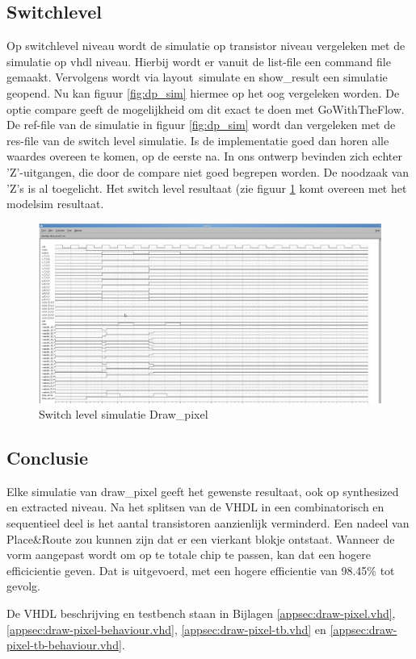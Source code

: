\documentclass{scrartcl} %
\begin{document}
\subsection{Switchlevel}
Op switchlevel niveau wordt de simulatie op transistor niveau vergeleken met de simulatie op vhdl niveau. Hierbij wordt er vanuit de list-file een command file gemaakt. Vervolgens wordt via layout\ simulate en show\_result een simulatie geopend. Nu kan figuur \ref{fig:dp_sim} hiermee op het oog vergeleken worden. De optie compare geeft de mogelijkheid om dit exact te doen met GoWithTheFlow. De ref-file van de simulatie in figuur \ref{fig:dp_sim} wordt dan vergeleken met de res-file van de switch level simulatie. Is de implementatie goed dan horen alle waardes overeen te komen, op de eerste na. In ons ontwerp bevinden zich echter 'Z'-uitgangen, die door de compare niet goed begrepen worden. De noodzaak van 'Z's is al toegelicht. Het switch level resultaat (zie figuur \ref{fig:dp_sw_lev} komt overeen met het modelsim resultaat.
\begin{figure} [h!]
\centering
\includegraphics [width = \textwidth] {resource/dp_sw_lev-rc}
\caption{Switch level simulatie Draw\_pixel}
\label{fig:dp_sw_lev}
\end{figure}



\subsection{Conclusie}
Elke simulatie van draw\_pixel geeft het gewenste resultaat, ook op synthesized en extracted niveau. Na het splitsen van de VHDL in een combinatorisch en sequentieel deel is het aantal transistoren aanzienlijk verminderd. Een nadeel van Place\&Route zou kunnen zijn dat er een vierkant blokje ontstaat. Wanneer de vorm aangepast wordt om op te totale chip te passen, kan dat een hogere efficicientie geven. Dat is uitgevoerd, met een hogere efficientie van 98.45\% tot gevolg. 

De VHDL beschrijving en testbench staan in Bijlagen \ref{appsec:draw-pixel.vhd}, \ref{appsec:draw-pixel-behaviour.vhd}, \ref{appsec:draw-pixel-tb.vhd} en \ref{appsec:draw-pixel-tb-behaviour.vhd}.
\end{document}
